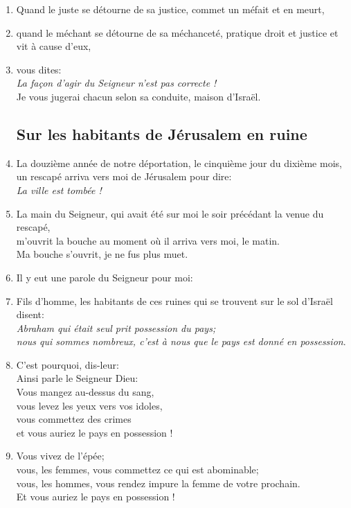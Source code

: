 \documentclass[12pt,a4paper,titlepage]{article}
\def \pslabelsep{0.2em} %
\def \psleftmargin{0em} %
\begin{document}
\begin{enumerate}[leftmargin=\psleftmargin, labelsep = \pslabelsep, label={\arabic*}, font=\color{\pscolor}\small\textsuperscript, parsep=0em, itemsep=0em, topsep=0em ]
\item Quand le juste se détourne de sa justice, commet un méfait et en meurt,
\item quand le méchant se détourne de sa méchanceté, pratique droit et justice et vit à cause d’eux,
\item vous dites: \\ \decalage \og{}\emph{La façon d’agir du Seigneur n’est pas correcte !}\fg{} \\ Je vous jugerai chacun selon sa conduite, maison d’Israël. \parSpace
\subsection*{Sur les habitants de Jérusalem en ruine}
\item La douzième année de notre déportation, le cinquième jour du dixième mois,\\ un rescapé arriva vers moi de Jérusalem pour dire:  \\ \decalage \og{}\emph{La ville est tombée !}\fg{}
\item La main du Seigneur, qui avait été sur moi le soir précédant la venue du rescapé, \\ m’ouvrit la bouche au moment où il arriva vers moi, le matin. \\ Ma bouche s’ouvrit, je ne fus plus muet. \verseSpace
\item Il y eut une parole du Seigneur pour moi:
\item Fils d’homme, les habitants de ces ruines qui se trouvent sur le sol d’Israël disent: \\\decalage  \og{}\emph{Abraham qui était seul prit possession du pays; \\ \decalage nous qui sommes nombreux, c’est à nous que le pays est donné en possession}.\fg{} \verseSpace
\item C’est pourquoi, dis-leur: \\ Ainsi parle le Seigneur Dieu: \\ Vous mangez au-dessus du sang, \\ vous levez les yeux vers vos idoles, \\ vous commettez des crimes \\ et vous auriez le pays en possession ! 
\item Vous vivez de l’épée; \\ vous, les femmes, vous commettez ce qui est abominable; \\ vous, les hommes, vous rendez impure la femme de votre prochain. \\ Et vous auriez le pays en possession ! \verseSpace

\end{enumerate}
\end{document}
